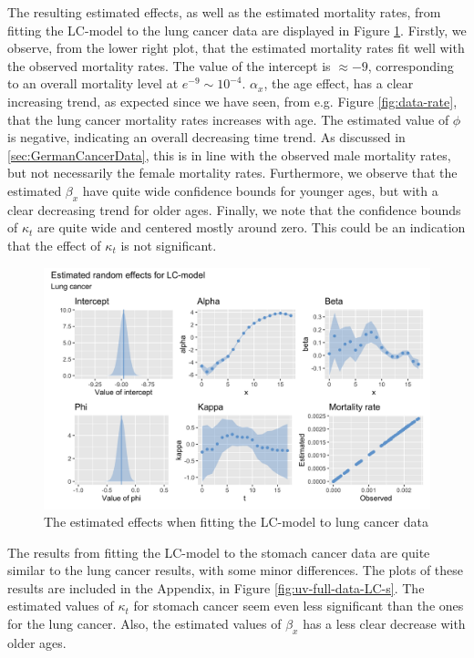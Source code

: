 \newpar The resulting estimated effects, as well as the estimated mortality rates, from fitting the LC-model to the lung cancer data are displayed in Figure \ref{fig:uv-full-data-LC-l}. Firstly, we observe, from the lower right plot, that the estimated mortality rates fit well with the observed mortality rates. The value of the intercept is $\approx -9$, corresponding to an overall mortality level at $e^{-9} \sim 10^{-4}$. $\alpha_x$, the age effect, has a clear increasing trend, as expected since we have seen, from e.g. Figure \ref{fig:data-rate}, that the lung cancer mortality rates increases with age. The estimated value of $\phi$ is negative, indicating an overall decreasing time trend. As discussed in \ref{sec:GermanCancerData}, this is in line with the observed male mortality rates, but not necessarily the female mortality rates. Furthermore, we observe that the estimated $\beta_x$ have quite wide confidence bounds for younger ages, but with a clear decreasing trend for older ages. Finally, we note that the confidence bounds of $\kappa_t$ are quite wide and centered mostly around zero. This could be an indication that the effect of $\kappa_t$ is not significant. 

\begin{figure}[h!]
    \centering
    \includegraphics[width=0.85\linewidth]{real-data/real-data-univariate/Figures/uv-full-data-lc-l.png}
    \caption{The estimated effects when fitting the LC-model to lung cancer data}
    \label{fig:uv-full-data-LC-l}
\end{figure}

\newpar The results from fitting the LC-model to the stomach cancer data are quite similar to the lung cancer results, with some minor differences. The plots of these results are included in the Appendix, in Figure \ref{fig:uv-full-data-LC-s}. The estimated values of $\kappa_t$ for stomach cancer seem even less significant than the ones for the lung cancer. Also, the estimated values of $\beta_x$ has a less clear decrease with older ages. 

